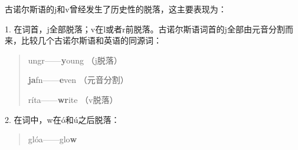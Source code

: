古诺尔斯语的j和v曾经发生了历史性的脱落，这主要表现为：

1.
在词首，j全部脱落；v在l或者r前脱落。古诺尔斯语词首的j全部由元音分割而来，比较几个古诺尔斯语和英语的同源词：

\begin{quote}
  ungr------\textbf{y}oung （j脱落）

  \textbf{ja}fn------\textbf{e}ven （元音分割）

  ríta------\textbf{wr}ite （v脱落）
\end{quote}

2. 在词中，w在ó和ú之后脱落：

\begin{quote}
  glóa------glo\textbf{w}
\end{quote}






